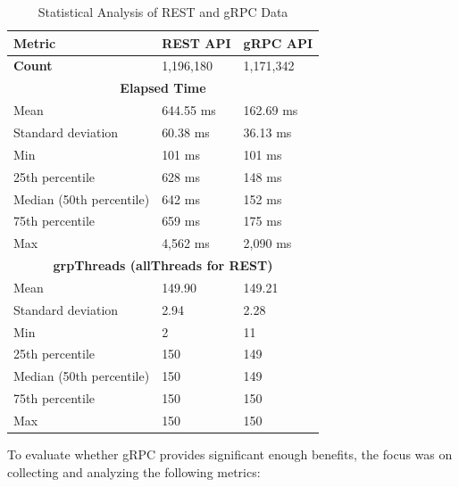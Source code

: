 \begin{table}[htbp]
\centering
\caption{Statistical Analysis of \ac{REST} and \ac{gRPC} Data}
\label{tab:rest_grpc_statistics}
\begin{tabular}{|l|l|l|}
\hline
\textbf{Metric} & \textbf{\ac{REST} \ac{API}} & \textbf{\ac{gRPC} \ac{API}} \\ \hline
\textbf{Count} & 1,196,180 & 1,171,342 \\ \hline
\multicolumn{3}{|c|}{\textbf{Elapsed Time}} \\ \hline
Mean & 644.55 ms & 162.69 ms \\ \hline
Standard deviation & 60.38 ms & 36.13 ms \\ \hline
Min & 101 ms & 101 ms \\ \hline
25th percentile & 628 ms & 148 ms \\ \hline
Median (50th percentile) & 642 ms & 152 ms \\ \hline
75th percentile & 659 ms & 175 ms \\ \hline
Max & 4,562 ms & 2,090 ms \\ \hline
\multicolumn{3}{|c|}{\textbf{grpThreads (allThreads for \ac{REST})}} \\ \hline
Mean & 149.90 & 149.21 \\ \hline
Standard deviation & 2.94 & 2.28 \\ \hline
Min & 2 & 11 \\ \hline
25th percentile & 150 & 149 \\ \hline
Median (50th percentile) & 150 & 149 \\ \hline
75th percentile & 150 & 150 \\ \hline
Max & 150 & 150 \\ \hline
\end{tabular}
\end{table}

\noindent To evaluate whether \ac{gRPC} provides significant enough benefits, the focus was on collecting and analyzing the following metrics:

